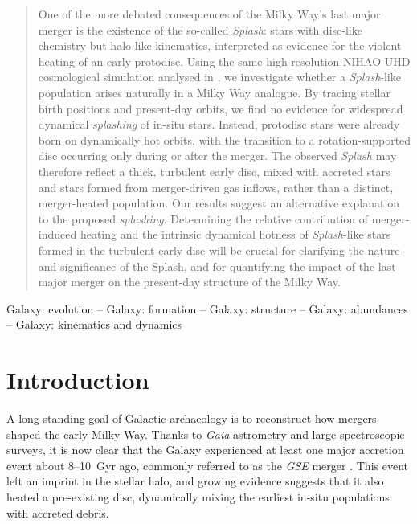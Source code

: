 \documentclass[fleqn,usenatbib]{mnras}
\begin{document}
\begin{abstract}
One of the more debated consequences of the Milky Way’s last major merger is the existence of the so-called \textit{Splash}: stars with disc-like chemistry but halo-like kinematics, interpreted as evidence for the violent heating of an early protodisc. Using the same high-resolution NIHAO-UHD cosmological simulation analysed in , we investigate whether a \textit{Splash}-like population arises naturally in a Milky Way analogue. By tracing stellar birth positions and present-day orbits, we find no evidence for widespread dynamical \textit{splashing} of in-situ stars. Instead, protodisc stars were already born on dynamically hot orbits, with the transition to a rotation-supported disc occurring only during or after the merger. The observed \textit{Splash} may therefore reflect a thick, turbulent early disc, mixed with accreted stars and stars formed from merger-driven gas inflows, rather than a distinct, merger-heated population. Our results suggest an alternative explanation to the proposed \textit{splashing}. Determining the relative contribution of merger-induced heating and the intrinsic dynamical hotness of \textit{Splash}-like stars formed in the turbulent early disc will be crucial for clarifying the nature and significance of the Splash, and for quantifying the impact of the last major merger on the present-day structure of the Milky Way.
\end{abstract}

\begin{keywords}
Galaxy: evolution -- Galaxy: formation -- Galaxy: structure -- Galaxy: abundances -- Galaxy: kinematics and dynamics
\end{keywords}


\section{Introduction}
\label{sec:introduction}

A long-standing goal of Galactic archaeology is to reconstruct how mergers shaped the early Milky Way. 
Thanks to \textit{Gaia} astrometry \citep{Brown2021b} and large spectroscopic surveys, it is now clear that the Galaxy experienced at least one major accretion event about 8--10~Gyr ago, commonly referred to as the \textit{GSE} merger \citep{Belokurov2018, Helmi2018, Naidu2020}. 
This event left an imprint in the stellar halo, and growing evidence suggests that it also heated a pre-existing disc, dynamically mixing the earliest in-situ populations with accreted debris.
\end{document}

